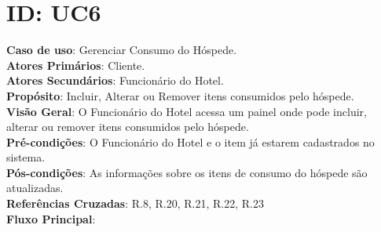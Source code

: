 \documentclass[notitlepage]{article}
\begin{document}
\clearpage

\section{ID: UC6}
\noindent\textbf{Caso de uso}: Gerenciar Consumo do Hóspede.\\
\textbf{Atores Primários}: Cliente. \\
\textbf{Atores Secundários}: Funcionário do Hotel.\\
\textbf{Propósito}: Incluir, Alterar ou Remover itens consumidos pelo hóspede.\\
\textbf{Visão Geral}: O Funcionário do Hotel acessa um painel onde pode incluir, alterar ou remover itens consumidos pelo hóspede.\\
\textbf{Pré-condições}: O Funcionário do Hotel e o item já estarem cadastrados no sistema.\\
\textbf{Pós-condições}: As informações sobre os itens de consumo do hóspede são atualizadas.\\
\textbf{Referências Cruzadas}: R.8, R.20, R.21, R.22, R.23\\
\newline
\textbf{Fluxo Principal}:\\
\end{document}
